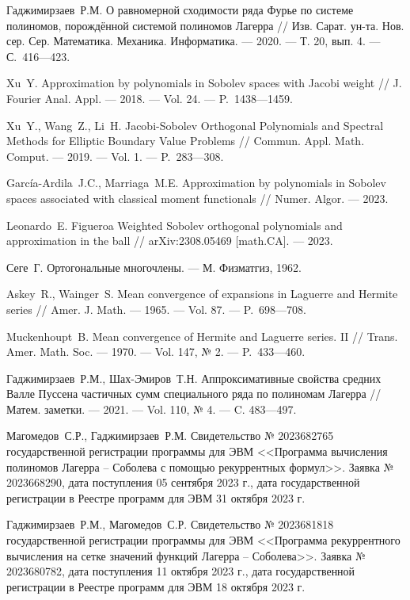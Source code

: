 \begin{thebibliography}{111}
{Гаджимирзаев~Р.М.} 
О равномерной сходимости ряда Фурье по системе полиномов, порождённой системой полиномов Лагерра 
// 
Изв. Сарат. ун-та. Нов. сер. Сер. Математика. Механика. Информатика. 
--- 2020. 
--- Т. 20, вып. 4. 
--- С.~416---423.


{Xu~Y.} 
Approximation by polynomials in Sobolev spaces with Jacobi weight 
// 
J. Fourier Anal. Appl. 
--- 2018. 
--- Vol. 24. 
--- P.~1438---1459.


{Xu~Y., Wang~Z., Li~H.} 
Jacobi-Sobolev Orthogonal Polynomials and Spectral Methods for Elliptic Boundary Value Problems 
//
Commun. Appl. Math. Comput.
--- 2019.
--- Vol. 1.
--- P.~283---308.

{Garc\'ia-Ardila~J.C., Marriaga~M.E.}
Approximation by polynomials in Sobolev spaces associated with classical moment functionals 
//
Numer. Algor.
--- 2023.

{Leonardo~E. Figueroa} 
Weighted Sobolev orthogonal polynomials and approximation in the ball 
// 
arXiv:2308.05469 [math.CA].
--- 2023.

{Сеге~Г.} 
Ортогональные многочлены. 
--- М. Физматгиз, 1962.

{Askey~R., Wainger~S.} 
Mean convergence of expansions in Laguerre and Hermite series 
// 
Amer. J. Math.
--- 1965.
--- Vol. 87.
--- P.~698---708.

{Muckenhoupt~B.} 
Mean convergence of Hermite and Laguerre series. II 
// 
Trans. Amer. Math. Soc. 
--- 1970.
--- Vol. 147, № 2.
--- P.~433---460.

{Гаджимирзаев~Р.М., Шах-Эмиров~Т.Н.} 
Аппроксимативные свойства средних Валле Пуссена частичных сумм специального ряда по полиномам Лагерра 
//
Матем. заметки.
--- 2021.
--- Vol. 110, № 4.
--- C. 483---497.

{Магомедов~С.Р., Гаджимирзаев~Р.М.} 
Свидетельство № 2023682765 государственной регистрации программы для ЭВМ <<Программа вычисления полиномов Лагерра -- Соболева с помощью рекуррентных формул>>. Заявка № 2023668290, дата поступления 05 сентября 2023 г., дата государственной регистрации в Реестре программ для ЭВМ 31 октября 2023 г.

{Гаджимирзаев~Р.М., Магомедов~С.Р.} 
Свидетельство № 2023681818 государственной регистрации программы для ЭВМ <<Программа рекуррентного вычисления на сетке значений функций Лагерра -- Соболева>>. Заявка № 2023680782, дата поступления 11 октября 2023 г., дата государственной регистрации в Реестре программ для ЭВМ 18 октября 2023 г.


\end{thebibliography}
